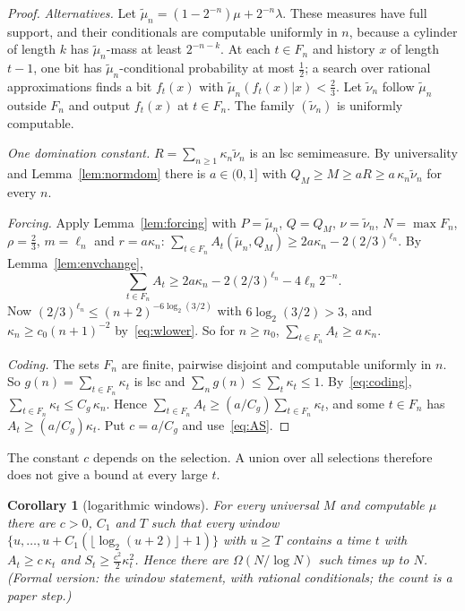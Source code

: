 \documentclass[11pt]{article}
\newtheorem{corollary}[theorem]{Corollary}
\theoremstyle{definition}
\theoremstyle{remark}
\begin{document}
\begin{proof}
\emph{Alternatives.} Let $\tilde\mu_n=(1-2^{-n})\mu+2^{-n}\lambda$. These measures
have full support, and their conditionals are computable uniformly in $n$,
because a cylinder of length $k$ has $\tilde\mu_n$-mass at least $2^{-n-k}$. At each
$t\in F_n$ and history $x$ of length $t-1$, one bit has $\tilde\mu_n$-conditional
probability at most $\frac12$; a search over rational approximations finds a
bit $f_t(x)$ with $\tilde\mu_n(f_t(x)|x)<\frac23$. Let $\tilde\nu_n$ follow $\tilde\mu_n$ outside
$F_n$ and output $f_t(x)$ at $t\in F_n$. The family $(\tilde\nu_n)$ is uniformly
computable.

\emph{One domination constant.} $R=\sum_{n\ge1}\kappa_n\tilde\nu_n$ is an lsc
semimeasure. By universality and Lemma~\ref{lem:normdom} there is $a\in(0,1]$
with $Q_M\ge M\ge aR\ge a\,\kappa_n\tilde\nu_n$ for every $n$.

\emph{Forcing.} Apply Lemma~\ref{lem:forcing} with $P=\tilde\mu_n$, $Q=Q_M$, $\nu=\tilde\nu_n$,
$N=\max F_n$, $\rho=\frac23$, $m=\ell_n$ and $r=a\kappa_n$:
$\sum_{t\in F_n}A_t(\tilde\mu_n,Q_M)\ge2a\kappa_n-2(2/3)^{\ell_n}$. By
Lemma~\ref{lem:envchange},
\[
\sum_{t\in F_n}A_t\ge2a\kappa_n-2(2/3)^{\ell_n}-4\ell_n2^{-n}.
\]
Now $(2/3)^{\ell_n}\le(n+2)^{-6\log_2(3/2)}$ with $6\log_2(3/2)>3$, and
$\kappa_n\ge c_0(n+1)^{-2}$ by~\eqref{eq:wlower}. So for $n\ge n_0$,
$\sum_{t\in F_n}A_t\ge a\,\kappa_n$.

\emph{Coding.} The sets $F_n$ are finite, pairwise disjoint and computable
uniformly in $n$. So $g(n)=\sum_{t\in F_n}\kappa_t$ is lsc and
$\sum_ng(n)\le\sum_t\kappa_t\le1$. By~\eqref{eq:coding},
$\sum_{t\in F_n}\kappa_t\le C_g\,\kappa_n$. Hence
$\sum_{t\in F_n}A_t\ge(a/C_g)\sum_{t\in F_n}\kappa_t$, and some $t\in F_n$ has
$A_t\ge(a/C_g)\kappa_t$. Put $c=a/C_g$ and use~\eqref{eq:AS}.
\end{proof}

The constant $c$ depends on the selection. A union over all selections
therefore does not give a bound at every large $t$.

\begin{corollary}[logarithmic windows]\label{cor:window}
For every universal $M$ and computable $\mu$ there are $c>0$, $C_1$ and $T$ such
that every window $\{u,\dots,u+C_1(\lfloor\log_2(u+2)\rfloor+1)\}$ with $u\ge T$
contains a time $t$ with $A_t\ge c\,\kappa_t$ and $S_t\ge\frac{c^2}2\kappa_t^2$. Hence
there are $\Omega(N/\log N)$ such times up to $N$. (Formal version: the
window statement, with rational conditionals; the count is a paper step.)
\end{corollary}
\end{document}
